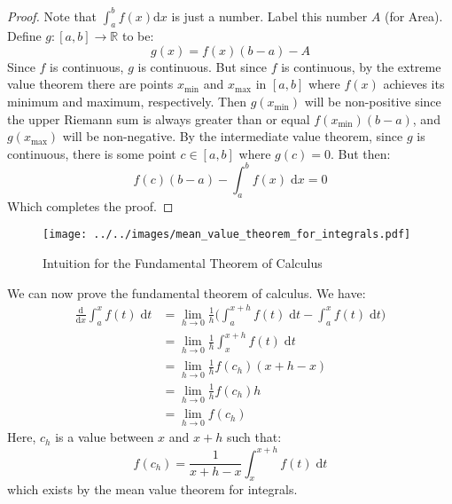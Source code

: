 \documentclass{article}
\theoremstyle{normal}
\theoremstyle{plain}
\begin{document}
    \begin{proof}
        Note that $\int_{a}^{b}f(x)\textrm{d}x$ is just a number. Label this
        number $A$ (for Area). Define $g:[a,b]\rightarrow\mathbb{R}$ to be:
        \begin{equation}
            g(x)=f(x)(b-a)-A
        \end{equation}
        Since $f$ is continuous, $g$ is continuous. But since $f$ is continuous,
        by the extreme value theorem there are points $x_{\textrm{min}}$ and
        $x_{\textrm{max}}$ in $[a,b]$ where $f(x)$ achieves its minimum and
        maximum, respectively. Then $g(x_{\textrm{min}})$ will be
        non-positive since the upper Riemann sum is always greater than or
        equal $f(x_{\textrm{min}})(b-a)$, and $g(x_{\textrm{max}})$ will be
        non-negative. By the intermediate value theorem, since $g$ is
        continuous, there is some point $c\in[a,b]$ where $g(c)=0$. But then:
        \begin{equation}
            f(c)(b-a)-\int_{a}^{b}f(x)\;\textrm{d}x=0
        \end{equation}
        Which completes the proof.
    \end{proof}
    \begin{figure}[H]
        \centering
        \texttt{[image: ../../images/mean\_value\_theorem\_for\_integrals.pdf]}
        \caption{Intuition for the Fundamental Theorem of Calculus}
    \end{figure}
    We can now prove the fundamental theorem of calculus. We have:
    \begin{align}
        \frac{\textrm{d}}{\textrm{d}x}\int_{a}^{x}f(t)\;\textrm{d}t
            &=\lim_{h\rightarrow{0}}\frac{1}{h}\Big(
                \int_{a}^{x+h}f(t)\;\textrm{d}t-
                \int_{a}^{x}f(t)\;\textrm{d}t\Big)\\
            &=\lim_{h\rightarrow{0}}\frac{1}{h}
                \int_{x}^{x+h}f(t)\;\textrm{d}t\\
            &=\lim_{h\rightarrow{0}}\frac{1}{h}f(c_{h})(x+h-x)\\
            &=\lim_{h\rightarrow{0}}\frac{1}{h}f(c_{h})h\\
            &=\lim_{h\rightarrow{0}}f(c_{h})
    \end{align}
    Here, $c_{h}$ is a value between $x$ and $x+h$ such that:
    \begin{equation}
        f(c_{h})=\frac{1}{x+h-x}\int_{x}^{x+h}f(t)\;\textrm{d}t
    \end{equation}
    which exists by the mean value theorem for integrals.
\end{document}
